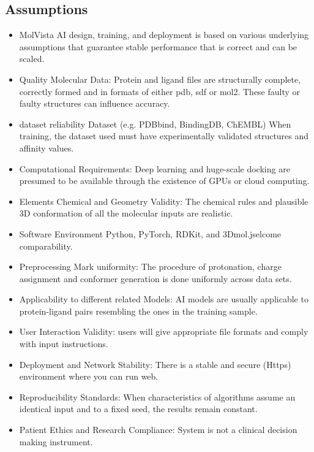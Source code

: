 \documentclass[12pt,a4]{report}
\begin{document}
\subsection{Assumptions}
\hspace*{0.3in}
\begin{itemize}
    \item MolVista AI design, training, and deployment is based on various underlying assumptions that guarantee stable performance that is correct and can be scaled.
    \item Quality Molecular Data: Protein and ligand files are structurally complete, correctly formed and in formats of either pdb, sdf or mol2. These faulty or faulty structures can influence accuracy.
    \item dataset reliability Dataset (e.g. PDBbind, BindingDB, ChEMBL) When training, the dataset used must have experimentally validated structures and affinity values.
    \item Computational Requirements: Deep learning and huge-scale docking are presumed to be available through the existence of GPUs or cloud computing.
    \item Elements Chemical and Geometry Validity: The chemical rules and plausible 3D conformation of all the molecular inputs are realistic.
    \item Software Environment Python, PyTorch, RDKit, and 3Dmol.jselcome comparability.
    \item Preprocessing Mark uniformity: The procedure of protonation, charge assignment and conformer generation is done uniformly across data sets.
    \item Applicability to different related Models: AI models are usually applicable to protein-ligand pairs resembling the ones in the training sample.
    \item User Interaction Validity: users will give appropriate file formats and comply with input instructions.
    \item Deployment and Network Stability: There is a stable and secure (Https) environment where you can run web.
    \item Reproducibility Standards: When characteristics of algorithms assume an identical input and to a fixed seed, the results remain constant.
    \item Patient Ethics and Research Compliance: System is not a clinical decision making instrument.
\end{itemize}
\end{document}
